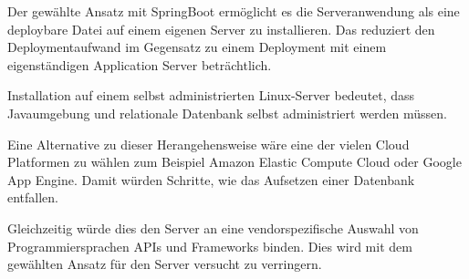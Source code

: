 Der gewählte Ansatz mit  SpringBoot ermöglicht es die Serveranwendung als eine deploybare Datei auf einem eigenen Server zu installieren. Das reduziert den Deploymentaufwand im Gegensatz zu einem Deployment mit einem  eigenständigen Application Server beträchtlich. 

Installation auf einem selbst administrierten Linux-Server bedeutet, dass Javaumgebung und relationale Datenbank selbst administriert werden müssen. 

Eine  Alternative zu dieser Herangehensweise wäre eine der vielen Cloud Platformen zu wählen zum Beispiel Amazon Elastic Compute Cloud oder Google App Engine. Damit würden Schritte, wie das Aufsetzen einer Datenbank entfallen. 

Gleichzeitig würde dies den Server an eine vendorspezifische Auswahl von Programmiersprachen APIs und Frameworks binden. 
Dies wird mit dem gewählten Ansatz für den Server versucht zu verringern. 




